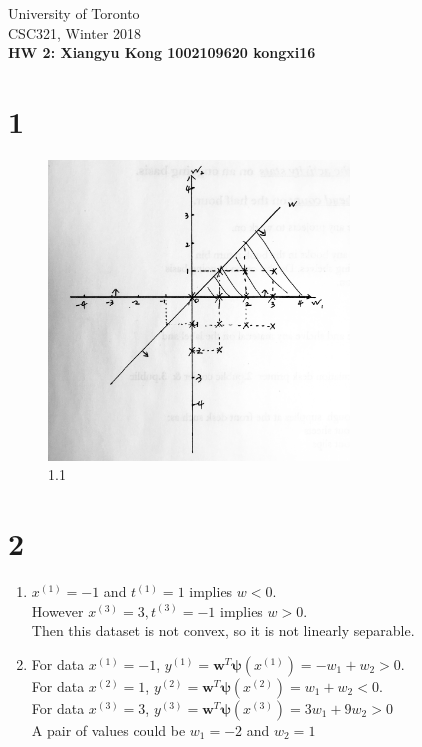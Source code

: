 \documentclass{article}
\begin{document}
\noindent
University of Toronto\\
{\sc CSC}321, Winter 2018\\[10pt]
{\LARGE\bf HW 2: Xiangyu Kong 1002109620 kongxi16} \\[10pt]

\section*{1}

	\begin{figure}[h]
		\centering
		\includegraphics[width=80mm]{1.JPG}
		\caption{1.1 \label{overflow}}
	\end{figure}

\section*{2}
\begin{enumerate}
	\item
	$x^{(1)} = -1$ and $t^{(1)} = 1$ implies $w < 0$.\\
	However $x^{(3)} = 3, t^{(3)} = -1$ implies $w > 0$.\\
	Then this dataset is not convex, so it is not linearly separable.
	
	
	\item
	For data $x^{(1)} = -1$, $y^{(1)} = \mathbf{w}^T \boldsymbol{\psi}(x^{(1)}) = -w_1 + w_2 > 0$.\\
	For data $x^{(2)} = 1$, $y^{(2)} = \mathbf{w}^T \boldsymbol{\psi}(x^{(2)}) = w_1 + w_2 < 0$.\\
	For data $x^{(3)} = 3$, $y^{(3)} = \mathbf{w}^T \boldsymbol{\psi}(x^{(3)}) = 3w_1 + 9w_2 > 0$\\
	A pair of values could be $w_1 = -2$ and $w_2 = 1$
\end{enumerate}
\end{document}
